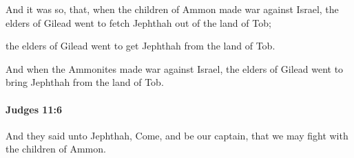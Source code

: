 			\begin{versebox}
					\item[BHS] 
					\item[ASV] And it was so, that, when the children of Ammon made war against Israel, the elders of Gilead went to fetch Jephthah out of the land of Tob;
					\item[NIV] the elders of Gilead went to get Jephthah from the land of Tob.
					\item[NRSV] And when the Ammonites made war against Israel, the elders of Gilead went to bring Jephthah from the land of Tob.
			\end{versebox}

		\paragraph{Judges 11:6} %
			\label{JUDGES-11-6}

			And they said unto Jephthah, Come, and be our captain, that we may fight with the children of Ammon.

